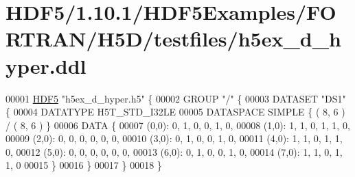 \hypertarget{_h_d_f5_21_810_81_2_h_d_f5_examples_2_f_o_r_t_r_a_n_2_h5_d_2testfiles_2h5ex__d__hyper_8ddl_source}{}\section{H\+D\+F5/1.10.1/\+H\+D\+F5\+Examples/\+F\+O\+R\+T\+R\+A\+N/\+H5\+D/testfiles/h5ex\+\_\+d\+\_\+hyper.ddl}
\label{_h_d_f5_21_810_81_2_h_d_f5_examples_2_f_o_r_t_r_a_n_2_h5_d_2testfiles_2h5ex__d__hyper_8ddl_source}

\begin{DoxyCode}
00001 \hyperlink{namespace_h_d_f5}{HDF5} \textcolor{stringliteral}{"h5ex\_d\_hyper.h5"} \{
00002 GROUP \textcolor{stringliteral}{"/"} \{
00003    DATASET \textcolor{stringliteral}{"DS1"} \{
00004       DATATYPE  H5T\_STD\_I32LE
00005       DATASPACE  SIMPLE \{ ( 8, 6 ) / ( 8, 6 ) \}
00006       DATA \{
00007       (0,0): 0, 1, 0, 0, 1, 0,
00008       (1,0): 1, 1, 0, 1, 1, 0,
00009       (2,0): 0, 0, 0, 0, 0, 0,
00010       (3,0): 0, 1, 0, 0, 1, 0,
00011       (4,0): 1, 1, 0, 1, 1, 0,
00012       (5,0): 0, 0, 0, 0, 0, 0,
00013       (6,0): 0, 1, 0, 0, 1, 0,
00014       (7,0): 1, 1, 0, 1, 1, 0
00015       \}
00016    \}
00017 \}
00018 \}
\end{DoxyCode}
